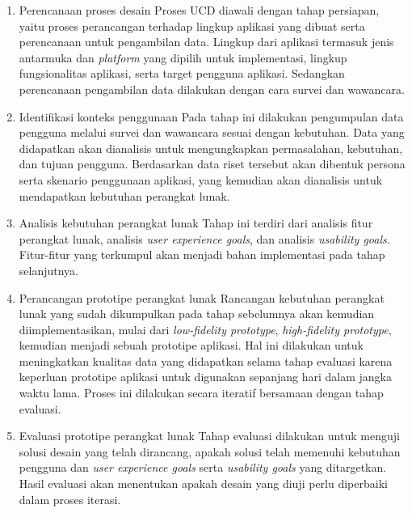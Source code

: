 \begin{enumerate}
  \item Perencanaan proses desain
  \subitem Proses UCD diawali dengan tahap persiapan, yaitu proses perancangan terhadap lingkup aplikasi yang dibuat serta perencanaan untuk pengambilan data. Lingkup dari aplikasi termasuk jenis antarmuka dan \textit{platform} yang dipilih untuk implementasi, lingkup fungsionalitas aplikasi, serta target pengguna aplikasi. Sedangkan perencanaan pengambilan data dilakukan dengan cara survei dan wawancara.

  \item Identifikasi konteks penggunaan
  \subitem Pada tahap ini dilakukan pengumpulan data pengguna melalui survei dan wawancara sesuai dengan kebutuhan. Data yang didapatkan akan dianalisis untuk mengungkapkan permasalahan, kebutuhan, dan tujuan pengguna. Berdasarkan data riset tersebut akan dibentuk persona serta skenario penggunaan aplikasi, yang kemudian akan dianalisis untuk mendapatkan kebutuhan perangkat lunak.
   
  \item Analisis kebutuhan perangkat lunak
  \subitem Tahap ini terdiri dari analisis fitur perangkat lunak, analisis \textit{user experience goals}, dan analisis \textit{usability goals}. Fitur-fitur yang terkumpul akan menjadi bahan implementasi pada tahap selanjutnya.
  
  \item Perancangan prototipe perangkat lunak
  \subitem Rancangan kebutuhan perangkat lunak yang sudah dikumpulkan pada tahap sebelumnya akan kemudian diimplementasikan, mulai dari \textit{low-fidelity prototype}, \textit{high-fidelity prototype}, kemudian menjadi sebuah prototipe aplikasi. Hal ini dilakukan untuk meningkatkan kualitas data yang didapatkan selama tahap evaluasi karena keperluan prototipe aplikasi untuk digunakan sepanjang hari dalam jangka waktu lama. Proses ini dilakukan secara iteratif bersamaan dengan tahap evaluasi.
  
  \item Evaluasi prototipe perangkat lunak
  \subitem Tahap evaluasi dilakukan untuk menguji solusi desain yang telah dirancang, apakah solusi telah memenuhi kebutuhan pengguna dan \textit{user experience goals} serta \textit{usability goals} yang ditargetkan. Hasil evaluasi akan menentukan apakah desain yang diuji perlu diperbaiki dalam proses iterasi.
  
\end{enumerate}

